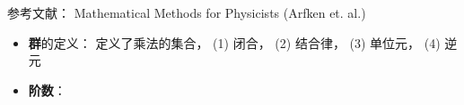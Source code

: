
参考文献： Mathematical Methods for Physicists (Arfken et. al.)

\begin{itemize}
\item \textbf{群}的定义： 定义了乘法的集合， (1) 闭合， (2) 结合律， (3) 单位元， (4) 逆元

\item \textbf{阶数}： 
\end{itemize}
